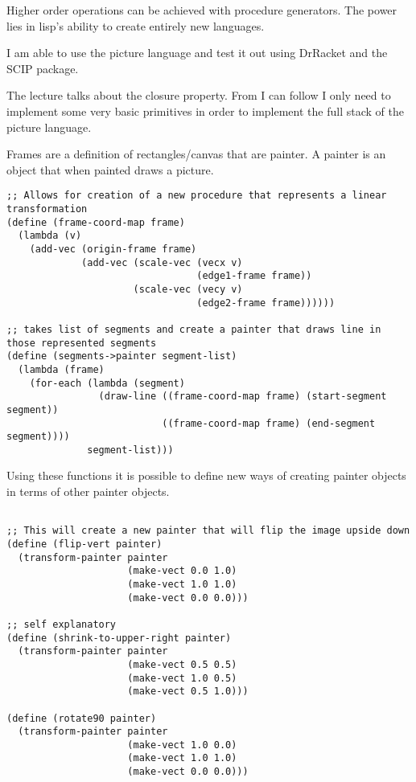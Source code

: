 \documentclass[11pt]{article}
\begin{document}
\begin{enumerate}
Higher order operations can be achieved with procedure generators. The
power lies in lisp's ability to create entirely new languages.

I am able to use the picture language and test it out using DrRacket and
the SCIP package.

The lecture talks about the closure property. From I can follow I only
need to implement some very basic primitives in order to implement the
full stack of the picture language.

Frames are a definition of rectangles/canvas that are painter. A painter
is an object that when painted draws a picture.

\begin{verbatim}
;; Allows for creation of a new procedure that represents a linear transformation
(define (frame-coord-map frame)
  (lambda (v)
    (add-vec (origin-frame frame)
             (add-vec (scale-vec (vecx v)
                                 (edge1-frame frame))
                      (scale-vec (vecy v)
                                 (edge2-frame frame))))))

;; takes list of segments and create a painter that draws line in those represented segments
(define (segments->painter segment-list)
  (lambda (frame)
    (for-each (lambda (segment)
                (draw-line ((frame-coord-map frame) (start-segment segment))
                           ((frame-coord-map frame) (end-segment segment))))
              segment-list)))
\end{verbatim}

Using these functions it is possible to define new ways of creating
painter objects in terms of other painter objects.

\begin{verbatim}

;; This will create a new painter that will flip the image upside down
(define (flip-vert painter)
  (transform-painter painter
                     (make-vect 0.0 1.0)
                     (make-vect 1.0 1.0)
                     (make-vect 0.0 0.0)))

;; self explanatory
(define (shrink-to-upper-right painter)
  (transform-painter painter
                     (make-vect 0.5 0.5)
                     (make-vect 1.0 0.5)
                     (make-vect 0.5 1.0)))

(define (rotate90 painter)
  (transform-painter painter
                     (make-vect 1.0 0.0)
                     (make-vect 1.0 1.0)
                     (make-vect 0.0 0.0)))


\end{verbatim}
\end{enumerate}
\end{document}
